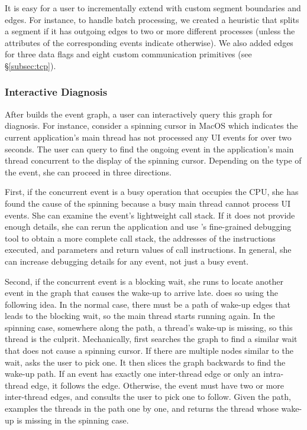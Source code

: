 It is easy for a user to incrementally extend \xxx with custom segment
boundaries and edges.  For instance, to handle batch processing, we
created a heuristic that splits a segment if it has outgoing edges to two
or more different processes (unless the attributes of the corresponding
events indicate otherwise).  We also added edges for three data flags and
eight custom communication primitives (see \S\ref{subsec:tcp}).

\subsubsection{Interactive Diagnosis} \label{subsec:debug}

After \xxx builds the event graph, a user can interactively query this graph
for diagnosis.  For instance, consider a spinning cursor in MacOS which
indicates the current application's main thread has not processed any UI events
for over two seconds.  The user can query \xxx to find the ongoing event in the
application's main thread concurrent to the display of the spinning cursor.
Depending on the type of the event, she can proceed in three directions.

First, if the concurrent event is a busy operation that occupies the CPU, she
has found the cause of the spinning because a busy main thread cannot process
UI events.  She can examine the event's lightweight call stack.  If it does not
provide enough details, she can rerun the application and use \xxx's
fine-grained debugging tool to obtain a more complete call stack, the addresses
of the instructions executed, and parameters and return values of call
instructions.  In general, she can increase debugging details for any event,
not just a busy event.

Second, if the concurrent event is a blocking wait, she runs \xxx to locate
another event in the graph that causes the wake-up to arrive late. \xxx does so
using the following idea.  In the normal case, there must be a path of wake-up
edges that leads to the blocking wait, so the main thread starts running again.
In the spinning case, somewhere along the path, a thread's wake-up is missing,
so this thread is the culprit.  Mechanically, \xxx first searches the graph to
find a similar wait that does not cause a spinning cursor.  If there are
multiple nodes similar to the wait, \xxx asks the user to pick one.  It then
slices the graph backwards to find the wake-up path.  If an event has exactly
one inter-thread edge or only an intra-thread edge, it follows the edge.
Otherwise, the event must have two or more inter-thread edges, and \xxx
consults the user to pick one to follow.  Given the path, \xxx examples the
threads in the path one by one, and returns the thread whose wake-up is missing
in the spinning case.


